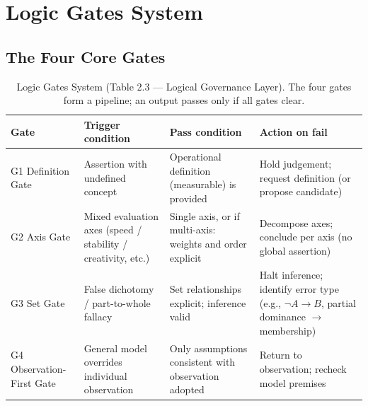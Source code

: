 
\section{Logic Gates System}
\label{sec:logic-gates-c2}


\subsection{The Four Core Gates}
\label{sec:dag-four-core-gates}

\begin{table}[ht]
\centering
\small
\begin{tabularx}{\linewidth}{lXXX}
\toprule
\textbf{Gate} & \textbf{Trigger condition} & \textbf{Pass condition} & \textbf{Action on fail} \\
\midrule
G1 Definition Gate
& Assertion with undefined concept
& Operational definition (measurable) is provided
& Hold judgement; request definition (or propose candidate) \\

G2 Axis Gate
& Mixed evaluation axes (speed / stability / creativity, etc.)
& Single axis, or if multi-axis: weights and order explicit
& Decompose axes; conclude per axis (no global assertion) \\

G3 Set Gate
& False dichotomy / part-to-whole fallacy
& Set relationships explicit; inference valid
& Halt inference; identify error type
(e.g., $\neg A \to B$, partial dominance $\to$ membership) \\

G4 Observation-First Gate
& General model overrides individual observation
& Only assumptions consistent with observation adopted
& Return to observation; recheck model premises \\
\bottomrule
\end{tabularx}
\caption[Logic Gates System]{Logic Gates System
(Table 2.3 --- Logical Governance Layer). The four gates form a
pipeline; an output passes only if all gates clear.}
\label{tab:logic-gates-c2}
\end{table}

